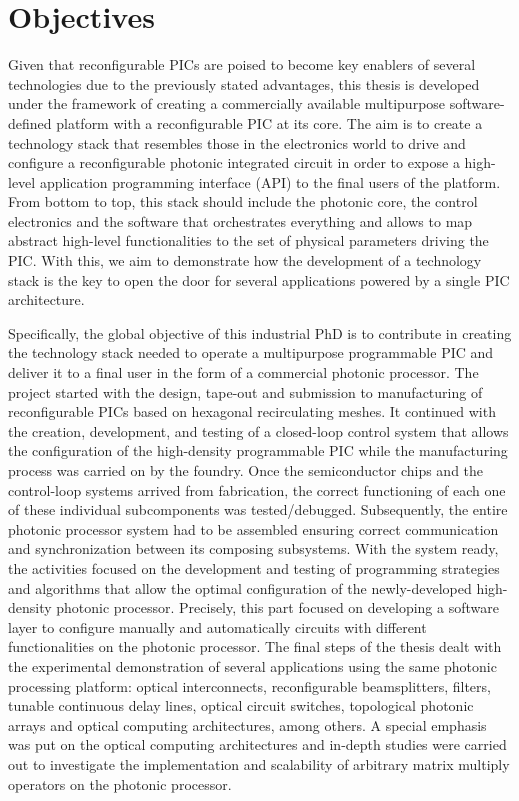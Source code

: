 \section{Objectives} \label{sec:objectives}

Given that reconfigurable PICs are poised to become key enablers of several technologies due to the previously stated advantages, this thesis is developed under the framework of creating a commercially available multipurpose software-defined platform with a reconfigurable PIC at its core.
The aim is to create a technology stack that resembles those in the electronics world to drive and configure a reconfigurable photonic integrated circuit in order to expose a high-level application programming interface (API) to the final users of the platform.
From bottom to top, this stack should include the photonic core, the control electronics and the software that orchestrates everything and allows to map abstract high-level functionalities to the set of physical parameters driving the PIC.
With this, we aim to demonstrate how the development of a technology stack is the key to open the door for several applications powered by a single PIC architecture.

Specifically, the global objective of this industrial PhD is to contribute in creating the technology stack needed to operate a multipurpose programmable PIC and deliver it to a final user in the form of a commercial photonic processor.
The project started with the design, tape-out and submission to manufacturing of reconfigurable PICs based on hexagonal recirculating meshes.
It continued with the creation, development, and testing of a closed-loop control system that allows the configuration of the high-density programmable PIC while the manufacturing process was carried on by the foundry.
Once the semiconductor chips and the control-loop systems arrived from fabrication, the correct functioning of each one of these individual subcomponents was tested/debugged.
Subsequently, the entire photonic processor system had to be assembled ensuring correct communication and synchronization between its composing subsystems.
With the system ready, the activities focused on the development and testing of programming strategies and algorithms that allow the optimal configuration of the newly-developed high-density photonic processor.
Precisely, this part focused on developing a software layer to configure manually and automatically circuits with different functionalities on the photonic processor.
The final steps of the thesis dealt with the experimental demonstration of several applications using the same photonic processing platform: optical interconnects, reconfigurable beamsplitters, filters, tunable continuous delay lines, optical circuit switches, topological photonic arrays and optical computing architectures, among others.
A special emphasis was put on the optical computing architectures and in-depth studies were carried out to investigate the implementation and scalability of arbitrary matrix multiply operators on the photonic processor.

